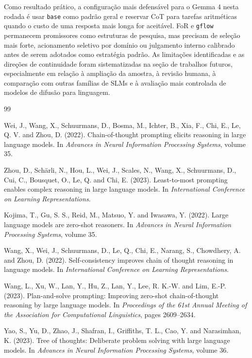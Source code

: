 \documentclass[12pt]{article}
\begin{document}
Como resultado prático, a configuração mais defensável para o Gemma 4 nesta rodada é usar \texttt{base} como padrão geral e reservar CoT para tarefas aritméticas quando o custo de uma resposta mais longa for aceitável. FoR e \texttt{gflow} permanecem promissores como estruturas de pesquisa, mas precisam de seleção mais forte, acionamento seletivo por domínio ou julgamento interno calibrado antes de serem adotados como estratégia padrão. As limitações identificadas e as direções de continuidade foram sistematizadas na seção de trabalhos futuros, especialmente em relação à ampliação da amostra, à revisão humana, à comparação com outras famílias de SLMs e à avaliação mais controlada de modelos de difusão para linguagem.

\begin{thebibliography}{99}

Wei, J., Wang, X., Schuurmans, D., Bosma, M., Ichter, B., Xia, F., Chi, E., Le, Q. V. and Zhou, D. (2022).
Chain-of-thought prompting elicits reasoning in large language models.
In \textit{Advances in Neural Information Processing Systems}, volume 35.

Zhou, D., Schärli, N., Hou, L., Wei, J., Scales, N., Wang, X., Schuurmans, D., Cui, C., Bousquet, O., Le, Q. and Chi, E. (2023).
Least-to-most prompting enables complex reasoning in large language models.
In \textit{International Conference on Learning Representations}.


Kojima, T., Gu, S. S., Reid, M., Matsuo, Y. and Iwasawa, Y. (2022).
Large language models are zero-shot reasoners.
In \textit{Advances in Neural Information Processing Systems}, volume 35.

Wang, X., Wei, J., Schuurmans, D., Le, Q., Chi, E., Narang, S., Chowdhery, A. and Zhou, D. (2022).
Self-consistency improves chain of thought reasoning in language models.
In \textit{International Conference on Learning Representations}.

Wang, L., Xu, W., Lan, Y., Hu, Z., Lan, Y., Lee, R. K.-W. and Lim, E.-P. (2023).
Plan-and-solve prompting: Improving zero-shot chain-of-thought reasoning by large language models.
In \textit{Proceedings of the 61st Annual Meeting of the Association for Computational Linguistics}, pages 2609--2634.

Yao, S., Yu, D., Zhao, J., Shafran, I., Griffiths, T. L., Cao, Y. and Narasimhan, K. (2023).
Tree of thoughts: Deliberate problem solving with large language models.
In \textit{Advances in Neural Information Processing Systems}, volume 36.


\end{thebibliography}
\end{document}
